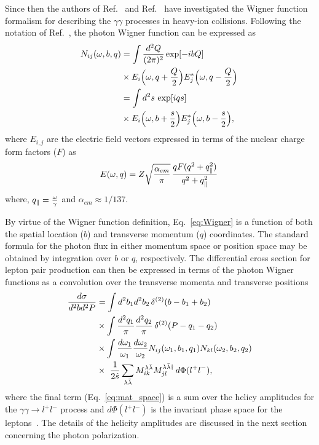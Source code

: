 \documentclass[twocolumn,epjc3]{svjour3}\sloppy
\begin{document}
Since then the authors of Ref.~\cite{kleinLeptonPairProduction2020a,Wang:2021kxm} and Ref.~\cite{klusek-gawendaCentralityDependenceDilepton2021} have investigated the Wigner function formalism for describing the $\gamma\gamma$ processes in heavy-ion collisions.
Following the notation of Ref.~\cite{klusek-gawendaCentralityDependenceDilepton2021}, the photon Wigner function can be expressed as
\begin{align}
  \begin{split}
    \label{eq:Wigner}
    N_{ij} (\omega,b,q) & = \int {d^2 Q \over (2 \pi)^2} \exp[-i b Q] \\ 
    & \times E_i \Big(\omega, q + {Q \over 2} \Big) E^*_j \Big(\omega, q - {Q \over 2} \Big) \, 
    \\
    & = \int d^2s \,  \exp[i q s] \\ 
    & \times E_i \Big(\omega, b + {s \over 2} \Big) E^*_j \Big(\omega, b - {s \over 2} \Big),
  \end{split}
\end{align}
where $E_{i,j}$ are the electric field vectors expressed in terms of the nuclear charge form factors ($F$) as
\begin{eqnarray}
    E (\omega,q) = Z \sqrt{\frac{\alpha_{em}}{\pi}} \,  {q F(q^2+q^2_\parallel) \over q^2 + q^2_\parallel} \,
\end{eqnarray}
where, $q_\parallel = {\omega \over \gamma}$ and $\alpha_{em}\approx 1/137$.

By virtue of the Wigner function definition, Eq.~\ref{eq:Wigner} is a function of both the spatial location ($b$) and transverse momentum ($q$) coordinates.
The standard formula for the photon flux in either momentum space or position space may be obtained by integration over $b$ or $q$, respectively. The differential cross section for lepton pair production can then be expressed in terms of the photon Wigner functions as a convolution over the transverse momenta and transverse positions~\cite{klusek-gawendaCentralityDependenceDilepton2021}
\begin{equation}
    \begin{split}
        \label{eq:mat_space}
        {d\sigma \over d^2b d^2P} &= \int d^2b_1 d^2b_2 \, \delta^{(2)}(b-b_1 + b_2)  \\
        &\times \int {d^2q_1 \over \pi} {d^2q_2 \over \pi} \, \delta^{(2)}(P-q_1 - q_2) \\
        &\times
        \int {d \omega_1 \over \omega_1} {d \omega_2 \over \omega_2} N_{ij} (\omega_1,b_1,q_1) N_{kl} (\omega_2,b_2,q_2)   \\ 
        &\times \, \, {1 \over 2 \hat s} \sum_{\lambda \bar \lambda} M^{\lambda \bar \lambda}_{ik} M^{\lambda \bar \lambda \dagger}_{jl} \, d\Phi(l^+ l^-),
    \end{split}
\end{equation}
where the final term (Eq.~\ref{eq:mat_space}) is a sum over the helicy amplitudes for the $\gamma\gamma \rightarrow l^+l^-$ process and $d\Phi(l^+ l^-)$ is the invariant phase space for the leptons~\cite{klusek-gawendaCentralityDependenceDilepton2021}. The details of the helicity amplitudes are discussed in the next section concerning the photon polarization.
\end{document}
